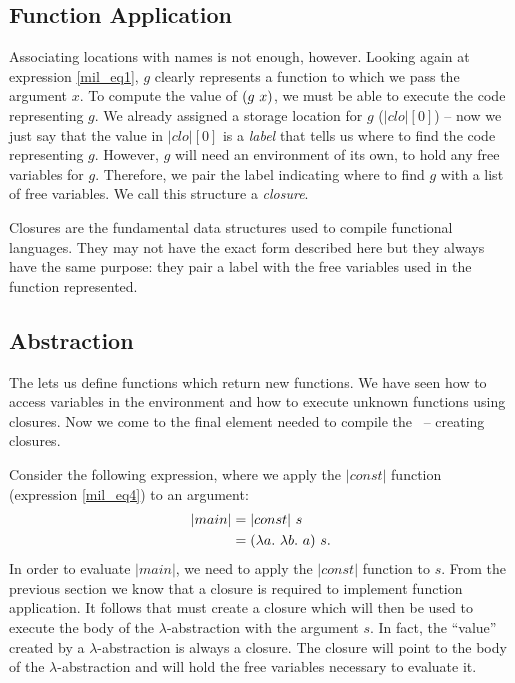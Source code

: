 \documentclass[12pt]{report}
\begin{document}
\subsection{Function Application}
\label{mil_subsec2}

Associating locations with names is not enough, however. Looking again
at expression \ref{mil_eq1}, $g$ clearly represents a function to
which we pass the argument $x$. To compute the value of
$(g\ x)$, we must be able to execute the code representing
$g$. We already assigned a storage location for $g$ ($|clo|[0]$) -- now
we just say that the value in $|clo|[0]$ is a \emph{label} that tells
us where to find the code representing $g$. However, $g$ will need
an environment of its own, to hold any free variables for $g$. Therefore,
we pair the label indicating where to find $g$ with a list of free
variables. We call this structure a \emph{closure}.

Closures are the fundamental data structures used to compile
functional languages. They may not have the exact form described here
but they always have the same purpose: they pair a label with the free
variables used in the function represented. 

\subsection{Abstraction}
\label{mil_subsec3}
The \lamA lets us define functions which return new functions. We have
seen how to access variables in the environment and how to execute
unknown functions using closures. Now we come to the final element
needed to compile the \lamA\ -- creating closures.

Consider the following expression, where we apply the $|const|$ function (expression 
\ref{mil_eq4}) to an argument:
\begin{equation}
  \begin{split}
    |main| &= |const|\ s \\
         &= (\lambda a.\ \lambda b.\ a)\ s.
  \end{split}
\end{equation}
In order to evaluate $|main|$, we need to apply the $|const|$ function
to $s$. From the previous section we know that a closure is required to
implement function application. It follows that
 must create a closure which will
then be used to execute the body of the $\lambda$-abstraction with the
argument $s$. In fact, the ``value'' created by a
$\lambda$-abstraction is always a closure. The closure will point to
the body of the $\lambda$-abstraction and will hold the free variables
necessary to evaluate it.
\end{document}

